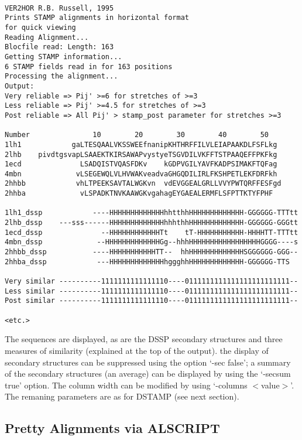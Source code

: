 \begin{scriptsize}\begin{verbatim}

VER2HOR R.B. Russell, 1995
Prints STAMP alignments in horizontal format
for quick viewing
Reading Alignment...
Blocfile read: Length: 163
Getting STAMP information...
6 STAMP fields read in for 163 positions 
Processing the alignment...
Output:
Very reliable => Pij' >=6 for stretches of >=3
Less reliable => Pij' >=4.5 for stretches of >=3
Post reliable => All Pij' > stamp_post parameter for stretches >=3

Number               10        20        30        40        50    
1lh1            gaLTESQAALVKSSWEEfnanipKHTHRFFILVLEIAPAAKDLFSFLkg
2lhb    pivdtgsvapLSAAEKTKIRSAWAPvystyeTSGVDILVKFFTSTPAAQEFFPKFkg
1ecd              LSADQISTVQASFDKv    kGDPVGILYAVFKADPSIMAKFTQFag
4mbn             vLSEGEWQLVLHVWAKveadvaGHGQDILIRLFKSHPETLEKFDRFkh
2hhbb            vhLTPEEKSAVTALWGKvn  vdEVGGEALGRLLVVYPWTQRFFESFgd
2hhba             vLSPADKTNVKAAWGKvgahagEYGAEALERMFLSFPTTKTYFPHF  

1lh1_dssp            ----HHHHHHHHHHHHHhhtthhHHHHHHHHHHHHH-GGGGGG-TTTtt
2lhb_dssp    ---sss------HHHHHHHHHHHHHhhhthhHHHHHHHHHHHHH-GGGGGG-GGGtt
1ecd_dssp              --HHHHHHHHHHHHTt    tT-HHHHHHHHHHH-HHHHTT-TTTtt
4mbn_dssp             --HHHHHHHHHHHHHGg--hhhHHHHHHHHHHHHHHHHHGGGG----s
2hhbb_dssp           ----HHHHHHHHHHHTT--  hhHHHHHHHHHHHHHSGGGGGG-GGG--
2hhba_dssp            ---HHHHHHHHHHHHHhggghhHHHHHHHHHHHHH-GGGGGG-TTS  

Very similar ----------1111111111111110----0111111111111111111111111--
Less similar ----------1111111111111110----0111111111111111111111111--
Post similar ----------1111111111111110----0111111111111111111111111--

<etc.>

\end{verbatim} \end{scriptsize}

The sequences are displayed, as are the DSSP secondary structures and three
measures of similarity (explained at the top of the output).  
the display of secondary structures can be suppressed using the option `-sec false';
a summary of the secondary structures (an average) can be displayed by using the `-secsum true' option. 
The column width can be modified by using `-columns $<$value$>$'.  The
remaning parameters are as for DSTAMP (see next section).

\subsection{Pretty Alignments via ALSCRIPT}


